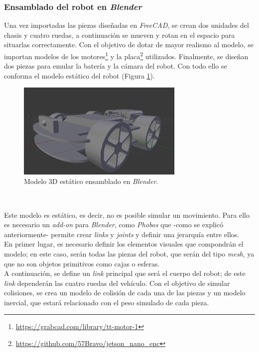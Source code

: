 \subsubsection{Ensamblado del robot en \textit{Blender}}
Una vez importadas las piezas diseñadas en \textit{FreeCAD}, se crean dos unidades del chasis y cuatro ruedas, a continuación se mueven y rotan en el espacio para situarlas correctamente. Con el objetivo de dotar de mayor realismo al modelo, se importan modelos de los motores\footnote{\url{https://grabcad.com/library/tt-motor-1}} y la placa\footnote{\url{https://github.com/57Bravo/jetson_nano_enc}} utilizados. Finalmente, se diseñan dos piezas para emular la batería y la cámara del robot. Con todo ello se conforma el modelo estático del robot (Figura \ref{fig:blendermodel}).\\

\begin{figure} [h!]
	\begin{center}
		\includegraphics[width=8cm]{figs/blenderModel}
	\end{center}
	\caption{Modelo 3D estático ensamblado en \textit{Blender}.}
	\label{fig:blendermodel}
\end{figure}\

Este modelo es estático, es decir, no es posible simular un movimiento. Para ello es necesario un \textit{add-on} para \textit{Blender}, como \textit{Phobos} que -como se explicó anteriormente- permite crear \textit{links} y \textit{joints} y definir una jerarquía entre ellos.\\

En primer lugar, es necesario definir los elementos visuales que compondrán el modelo; en este caso, serán todas las piezas del robot, que serán del tipo \textit{mesh}, ya que no son objetos primitivos como cajas o esferas.\\

A continuación, se define un \textit{link} principal que será el cuerpo del robot; de este \textit{link} dependerán las cuatro ruedas del vehículo. Con el objetivo de simular colisiones, se crea un modelo de colisión de cada una de las piezas y un modelo inercial, que estará relacionado con el peso simulado de cada pieza.\\

